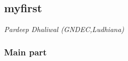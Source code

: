  


\label{2}

\subsection*{myfirst}
\textit{Pardeep Dhaliwal (GNDEC,Ludhiana)}

% 



\subsubsection*{Main part}

\documentclass{article}

This is my \emph{first} document in \LaTeX





 

\index[authors]{kaur, sandeep}

\label{10}

\subsection*{cvs cheatsheat}
\textit{sandeep kaur (Student)}


